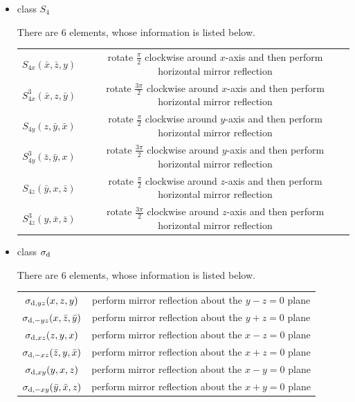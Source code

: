 \documentclass[a4paper]{book}
\begin{document}
\begin{solution}
\begin{itemize}
		\item class $S_4$

		There are 6 elements, whose information is listed below. \vspace{-1em}
		\begin{center}
		\begin{tabular}{c|c} \hline
			$S_{4x}(\bar x,\bar z, y)$	& rotate $\frac\pi2$ clockwise around $x$-axis and then perform horizontal mirror reflection\\
			$S^3_{4x}(\bar x, z, \bar y)$	& rotate $\frac{3\pi}2$ clockwise around $x$-axis and then perform horizontal mirror reflection\\
			$S_{4y}(z, \bar y, \bar x)$	& rotate $\frac\pi2$ clockwise around $y$-axis and then perform horizontal mirror reflection\\
			$S^3_{4y}(\bar z, \bar y, x)$ & rotate $\frac{3\pi}2$ clockwise around $y$-axis and then perform horizontal mirror reflection\\
			$S_{4z}(\bar y, x, \bar z)$	& rotate $\frac\pi2$ clockwise around $z$-axis and then perform horizontal mirror reflection\\
			$S^3_{4z}(y, \bar x, \bar z)$	& rotate $\frac{3\pi}2$ clockwise around $z$-axis and then perform horizontal mirror reflection\\ \hline
		\end{tabular}
		\end{center}
		
		\item class $\sigma_{\rm d}$

		There are 6 elements, whose information is listed below. \vspace{-1em}
		\begin{center}
		\begin{tabular}{c|c} \hline
			$\sigma_{{\rm d},yz}(x, z, y)$ & perform mirror reflection about the $y-z=0$ plane \\
			$\sigma_{{\rm d},-yz}(x, \bar z, \bar y)$	& perform mirror reflection about the $y+z=0$ plane \\
			$\sigma_{{\rm d},xz}(z, y, x)$ & perform mirror reflection about the $x-z=0$ plane \\
			$\sigma_{{\rm d},-xz}(\bar z, y, \bar x)$	& perform mirror reflection about the $x+z=0$ plane \\
			$\sigma_{{\rm d},xy}(y, x, z)$ & perform mirror reflection about the $x-y=0$ plane \\
			$\sigma_{{\rm d},-xy}(\bar y, \bar x, z)$	& perform mirror reflection about the $x+y=0$ plane \\ \hline
		\end{tabular}
		\end{center}


\end{itemize}
\end{solution}
\end{document}
